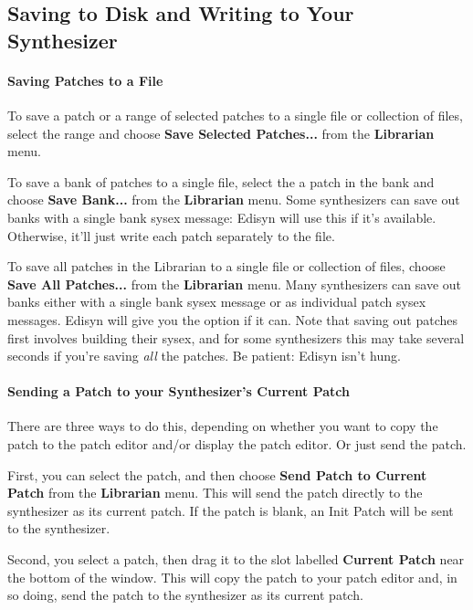 \documentclass{article}
\begin{document}
\subsection{Saving to Disk and Writing to Your Synthesizer} 

\paragraph{Saving Patches to a File}

To save a patch or a range of selected patches to a single file or collection of files, select the range and choose {\bf Save Selected Patches...} from the {\bf Librarian} menu.

To save a bank of patches to a single file, select the a patch in the bank and choose {\bf Save Bank...} from the {\bf Librarian} menu.  Some synthesizers can save out banks with a single bank sysex message: Edisyn will use this if it's available. Otherwise, it'll just write each patch separately to the file.

To save all patches in the Librarian  to a single file or collection of files, choose {\bf Save All Patches...} from the {\bf Librarian} menu.  Many synthesizers can save out banks either with a single bank sysex message or as individual patch sysex messages.  Edisyn will give you the option if it can.  Note that saving out patches first involves building their sysex, and for some synthesizers this may take several seconds if you're saving {\it all} the patches.  Be patient: Edisyn isn't hung.

\paragraph{Sending a Patch to your Synthesizer's Current Patch}

There are three ways to do this, depending on whether you want to copy the patch to the patch editor and/or display the patch editor.  Or just send the patch.

First, you can select the patch, and then choose {\bf Send Patch to Current Patch} from the {\bf Librarian} menu.  This will send the patch directly to the synthesizer as its current patch.  If the patch is blank, an Init Patch will be sent to the synthesizer.

Second, you select a patch, then drag it to the slot labelled {\bf Current Patch} near the bottom of the window.  This will copy the patch to your patch editor and, in so doing, send the patch to the synthesizer as its current patch.
\end{document}
